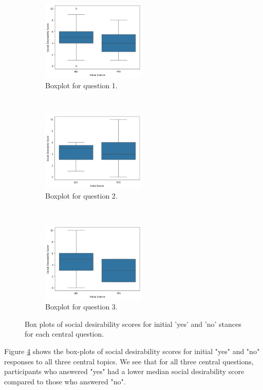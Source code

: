\documentclass{scrartcl}
\begin{document}
\begin{figure}[t!]
    \centering
    \begin{subfigure}[t]{0.3\textwidth}
        \centering
        \includegraphics[height=1.5in]{fig/social_desirability_topic_33.png}
        \caption{Boxplot for question 1.}
        \label{graph:social-desirability-1}
    \end{subfigure}%
    ~
    \begin{subfigure}[t]{0.3\textwidth}
        \centering
        \includegraphics[height=1.5in]{fig/social_desirability_topic_48.png}
        \caption{Boxplot for question 2.}
        \label{graph:social-desirability-2}
    \end{subfigure}%
    ~
    \begin{subfigure}[t]{0.3\textwidth}
        \centering
        \includegraphics[height=1.5in]{fig/social_desirability_topic_73.png}
        \caption{Boxplot for question 3.}
        \label{graph:social-desirability-3}
    \end{subfigure}%
    \caption{Box plots of social desirability scores for initial 'yes' and 'no' stances for each central question.}
    \label{graph:social-desirability-all}
\end{figure}

Figure \ref{graph:social-desirability-all} shows the box-plots of social desirability scores for initial "yes" and "no" responses to all three central topics. We see that for all three central questions, participants who answered "yes" had a lower median social desirability score compared to those who answered "no".
\end{document}
